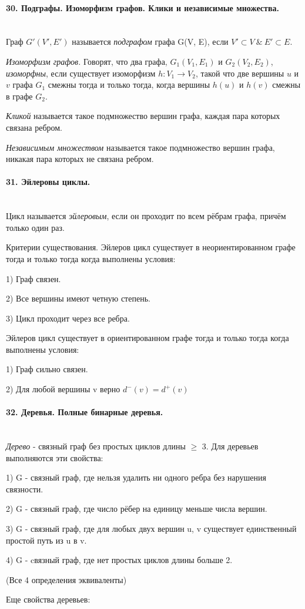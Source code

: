 \documentclass[a4paper, 12pt]{article}
\newcommand{\parag}[1]{\paragraph{#1}\mbox{}\\}
\begin{document}
\parag{30. Подграфы. Изоморфизм графов. Клики и независимые множества.}
Граф $G'(V', E')$ называется \textit{подграфом} графа G(V, E), если $V' \subset V\ \&\ E' \subset E$.

\noindent
\textit{Изоморфизм графов.}
Говорят, что два графа, $G_{1}(V_{1}, E_{1})$ и $G_{2}(V_{2}, E_{2})$, \textit{изоморфны}, если существует изоморфизм $h: V_{1} \rightarrow V_{2}$, такой что две вершины $u$ и $v$ графа $G_{1}$ смежны тогда и только тогда, когда вершины $h(u)$ и $h(v)$ смежны в графе $G_{2}$.


\noindent
\textit{Кликой} называется такое подмножество вершин графа, каждая пара которых связана ребром.

\noindent
\textit{Независимым множеством} называется такое подмножество вершин графа, никакая пара которых не связана ребром.


\parag{31. Эйлеровы циклы.}
Цикл называется \textit{эйлеровым}, если он проходит по всем рёбрам графа, причём только один раз.

\noindent
Критерии существования. Эйлеров цикл существует в неориентированном графе тогда и только тогда когда выполнены условия:

1) Граф связен.

2) Все вершины имеют четную степень.

3) Цикл проходит через все ребра.

\noindent
Эйлеров цикл существует в ориентированном графе тогда и только тогда когда выполнены условия:

1) Граф сильно связен.

2) Для любой вершины v верно $d^{-}(v) = d^{+}(v)$


\parag{32. Деревья. Полные бинарные деревья.}
\textit{Дерево} - связный граф без простых циклов длины $\geqslant$ 3. Для деревьев  выполняются эти свойства:

1) G - связный граф, где нельзя удалить ни одного ребра без нарушения связности.

2) G - связный граф, где число рёбер на единицу меньше числа вершин.

3) G - связный граф, где для любых двух вершин u, v существует единственный простой путь из u в v.

4) G - cвязный граф, где нет простых циклов длины больше 2.

(Все 4 определения эквиваленты)

\vskip 0.2in

\noindent
Еще свойства деревьев:
\end{document}
